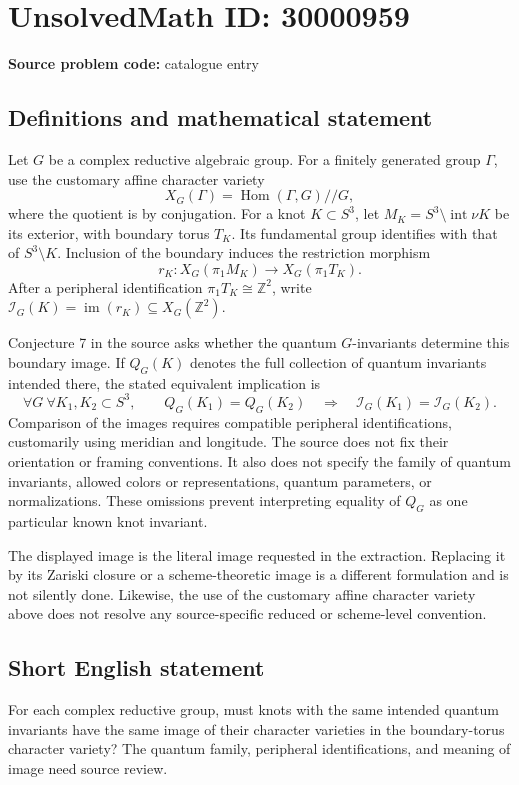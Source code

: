\documentclass[11pt]{article}
\newcommand{\Z}{\mathbb{Z}}
\begin{document}
\section*{UnsolvedMath ID: 30000959}
\textbf{Source problem code:} catalogue entry
\subsection{Definitions and mathematical statement}
Let \(G\) be a complex reductive algebraic group. For a finitely generated group \(\Gamma\), use the customary affine character variety
\[
X_G(\Gamma)=\operatorname{Hom}(\Gamma,G)\mathbin{/\!/}G,
\]
where the quotient is by conjugation. For a knot \(K\subset S^3\), let \(M_K=S^3\setminus\operatorname{int}\nu K\) be its exterior, with boundary torus \(T_K\). Its fundamental group identifies with that of \(S^3\setminus K\). Inclusion of the boundary induces the restriction morphism
\[
r_K:X_G(\pi_1M_K)\longrightarrow X_G(\pi_1T_K).
\]
After a peripheral identification \(\pi_1T_K\cong\Z^2\), write \(\mathcal I_G(K)=\operatorname{im}(r_K)\subseteq X_G(\Z^2)\).

Conjecture 7 in the source asks whether the quantum \(G\)-invariants determine this boundary image. If \(Q_G(K)\) denotes the full collection of quantum invariants intended there, the stated equivalent implication is
\[
\forall G\ \forall K_1,K_2\subset S^3,\qquad
Q_G(K_1)=Q_G(K_2)\quad\Longrightarrow\quad
\mathcal I_G(K_1)=\mathcal I_G(K_2).
\]
Comparison of the images requires compatible peripheral identifications, customarily using meridian and longitude. The source does not fix their orientation or framing conventions. It also does not specify the family of quantum invariants, allowed colors or representations, quantum parameters, or normalizations. These omissions prevent interpreting equality of \(Q_G\) as one particular known knot invariant.

The displayed image is the literal image requested in the extraction. Replacing it by its Zariski closure or a scheme-theoretic image is a different formulation and is not silently done. Likewise, the use of the customary affine character variety above does not resolve any source-specific reduced or scheme-level convention.
\subsection{Short English statement}
For each complex reductive group, must knots with the same intended quantum invariants have the same image of their character varieties in the boundary-torus character variety? The quantum family, peripheral identifications, and meaning of image need source review.
\end{document}

